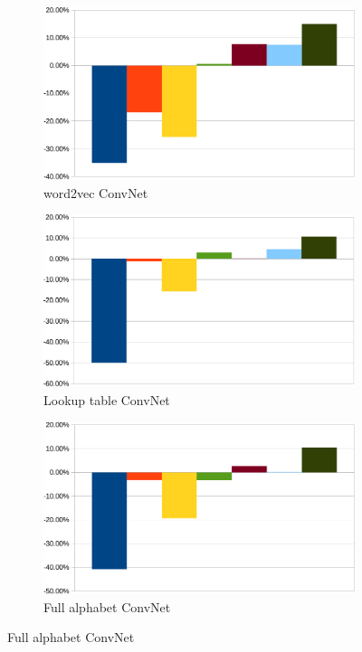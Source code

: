 \documentclass{article} %
\begin{document}
\begin{figure}[ht]
  \begin{subfigure}[b]{0.3\textwidth}
    \includegraphics[width=\textwidth]{word2vec}
    \caption{word2vec ConvNet}
    \label{fig:w2ve}
  \end{subfigure}
  \begin{subfigure}[b]{0.3\textwidth}
    \includegraphics[width=\textwidth]{lookup}
    \caption{Lookup table ConvNet}
    \label{fig:look}
  \end{subfigure}
  \begin{subfigure}[b]{0.3\textwidth}
    \includegraphics[width=\textwidth]{full}
    \caption{Full alphabet ConvNet}
    \label{fig:full}
  \end{subfigure}


\end{figure}
\end{document}
